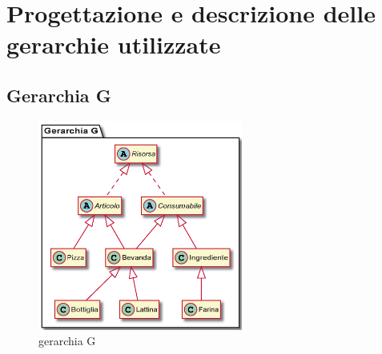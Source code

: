 \documentclass[
  10pt,
]{article}
\begin{document}
\hypertarget{progettazione-e-descrizione-delle-gerarchie-utilizzate}{%
\section{Progettazione e descrizione delle gerarchie
utilizzate}\label{progettazione-e-descrizione-delle-gerarchie-utilizzate}}

\hypertarget{gerarchia-g}{%
\subsection{Gerarchia G}\label{gerarchia-g}}

\begin{figure}
\centering
\includegraphics[width=0.6\textwidth,height=\textheight]{./gerarchiaG.png}
\caption{gerarchia G}
\end{figure}
\newpage
\end{document}
